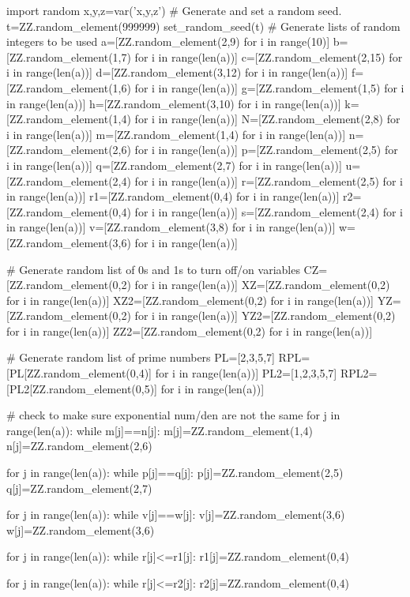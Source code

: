 \documentclass{article}%
\begin{document}
\begin{sagesilent}
import random
x,y,z=var('x,y,z')
# Generate and set a random seed.
t=ZZ.random_element(999999)
set_random_seed(t)
# Generate lists of random integers to be used
a=[ZZ.random_element(2,9) for i in range(10)]
b=[ZZ.random_element(1,7) for i in range(len(a))]
c=[ZZ.random_element(2,15) for i in range(len(a))]
d=[ZZ.random_element(3,12) for i in range(len(a))]
f=[ZZ.random_element(1,6) for i in range(len(a))]
g=[ZZ.random_element(1,5) for i in range(len(a))]
h=[ZZ.random_element(3,10) for i in range(len(a))]
k=[ZZ.random_element(1,4) for i in range(len(a))]
N=[ZZ.random_element(2,8) for i in range(len(a))]
m=[ZZ.random_element(1,4) for i in range(len(a))]
n=[ZZ.random_element(2,6) for i in range(len(a))]
p=[ZZ.random_element(2,5) for i in range(len(a))]
q=[ZZ.random_element(2,7) for i in range(len(a))]
u=[ZZ.random_element(2,4) for i in range(len(a))]
r=[ZZ.random_element(2,5) for i in range(len(a))]
r1=[ZZ.random_element(0,4) for i in range(len(a))]
r2=[ZZ.random_element(0,4) for i in range(len(a))]
s=[ZZ.random_element(2,4) for i in range(len(a))]
v=[ZZ.random_element(3,8) for i in range(len(a))]
w=[ZZ.random_element(3,6) for i in range(len(a))]


# Generate random list of 0s and 1s to turn off/on variables
CZ=[ZZ.random_element(0,2) for i in range(len(a))]
XZ=[ZZ.random_element(0,2) for i in range(len(a))]
XZ2=[ZZ.random_element(0,2) for i in range(len(a))]
YZ=[ZZ.random_element(0,2) for i in range(len(a))]
YZ2=[ZZ.random_element(0,2) for i in range(len(a))]
ZZ2=[ZZ.random_element(0,2) for i in range(len(a))]


# Generate random list of prime numbers
PL=[2,3,5,7]
RPL=[PL[ZZ.random_element(0,4)] for i in range(len(a))]
PL2=[1,2,3,5,7]
RPL2=[PL2[ZZ.random_element(0,5)] for i in range(len(a))]


# check to make sure exponential num/den are not the same
for j in range(len(a)):
  while m[j]==n[j]:
    m[j]=ZZ.random_element(1,4)
    n[j]=ZZ.random_element(2,6)

for j in range(len(a)):
  while p[j]==q[j]:
    p[j]=ZZ.random_element(2,5)
    q[j]=ZZ.random_element(2,7)
    
for j in range(len(a)):
  while v[j]==w[j]:
    v[j]=ZZ.random_element(3,6)
    w[j]=ZZ.random_element(3,6)   
  
for j in range(len(a)):
  while r[j]<=r1[j]:
    r1[j]=ZZ.random_element(0,4)

for j in range(len(a)):
  while r[j]<=r2[j]:
    r2[j]=ZZ.random_element(0,4)    
    



\end{sagesilent}
\end{document}
